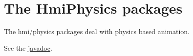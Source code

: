 \ifx \hmiphysicsreportdir \undefinedmacro {} \fi
\ifx \webserver \undefinedmacro \def \webserver{http://elckerlyc.sourceforge.net/javadoc/Hmi/} \fi

\chapter{The HmiPhysics packages}
The hmi/physics packages deal with physics based animation.


See the \href{\webserver}{javadoc}.





%
